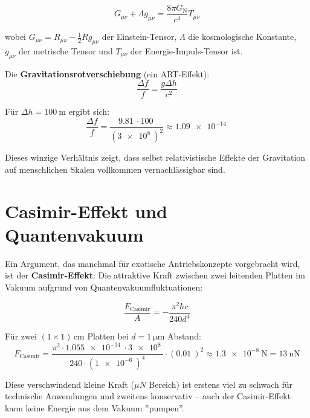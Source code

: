﻿\documentclass[12pt, a4paper]{report}
\theoremstyle{definition}
\theoremstyle{remark}
\newcommand{\G}{G_{\text{N}}}          %
\begin{document}
\begin{equation}
  G_{\mu\nu} + \Lambda g_{\mu\nu} = \frac{8\pi \G}{c^4} T_{\mu\nu}
  \label{eq:einstein_feld}
\end{equation}

wobei $G_{\mu\nu} = R_{\mu\nu} - \frac{1}{2}Rg_{\mu\nu}$ der Einstein-Tensor,
$\Lambda$ die kosmologische Konstante, $g_{\mu\nu}$ der metrische Tensor und
$T_{\mu\nu}$ der Energie-Impuls-Tensor ist.

Die \textbf{Gravitationsrotverschiebung} (ein ART-Effekt):
\begin{equation}
  \frac{\Delta f}{f} = \frac{g \Delta h}{c^2}
  \label{eq:rotverschiebung}
\end{equation}

Für $\Delta h = \SI{100}{\metre}$ ergibt sich:
\begin{equation}
  \frac{\Delta f}{f} = \frac{\SI{9.81}{} \cdot \SI{100}{}}{(\SI{3e8}{})^2}
  \approx \SI{1.09e-14}{}
\end{equation}

Dieses winzige Verhältnis zeigt, dass selbst relativistische Effekte der
Gravitation auf menschlichen Skalen vollkommen vernachlässigbar sind.

\section{Casimir-Effekt und Quantenvakuum}

Ein Argument, das manchmal für exotische Antriebskonzepte vorgebracht wird,
ist der \textbf{Casimir-Effekt}: Die attraktive Kraft zwischen zwei leitenden
Platten im Vakuum aufgrund von Quantenvakuumfluktuationen:

\begin{equation}
  \frac{F_{\text{Casimir}}}{A} = -\frac{\pi^2 \hbar c}{240 d^4}
  \label{eq:casimir}
\end{equation}

Für zwei $(1 \times 1)\,\si{\centi\metre}$ Platten bei $d = \SI{1}{\micro\metre}$ Abstand:
\begin{equation}
  F_{\text{Casimir}} = \frac{\pi^2 \cdot \SI{1.055e-34}{} \cdot \SI{3e8}{}}{240 \cdot (\SI{1e-6}{})^4}
  \cdot (\SI{0.01}{})^2 \approx \SI{1.3e-8}{\newton} = \SI{13}{\nano\newton}
\end{equation}

Diese verschwindend kleine Kraft ($\mu N$ Bereich) ist erstens viel zu schwach
für technische Anwendungen und zweitens konservativ -- auch der Casimir-Effekt
kann keine Energie aus dem Vakuum ''pumpen''.
\end{document}

